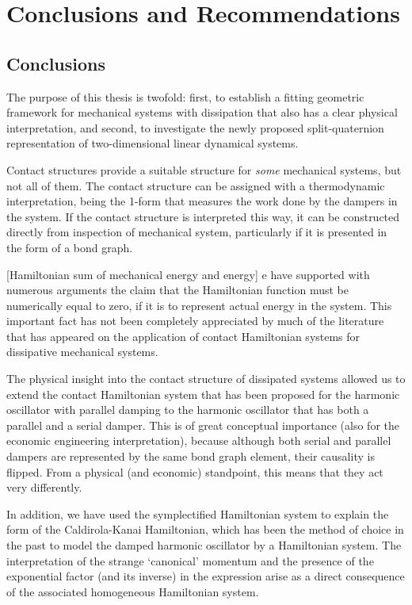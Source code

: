 \chapter{Conclusions and Recommendations}
\label{chap:conclusion}

\section*{Conclusions}
The purpose of this thesis is twofold: first, to establish a fitting geometric framework for mechanical systems with dissipation that also has a clear physical interpretation, and second, to investigate the newly proposed split-quaternion representation of two-dimensional linear dynamical systems. 

Contact structures provide a suitable structure for \emph{some} mechanical systems, but not all of them. The contact structure can be assigned with a thermodynamic interpretation, being the 1-form that measures the work done by the dampers in the system. If the contact structure is interpreted this way, it can be constructed  directly from inspection of mechanical system, particularly if it is presented in the form of a bond graph. 

[Hamiltonian sum of mechanical energy and energy] e have supported with numerous arguments the claim that the Hamiltonian function must be numerically equal to zero, if it is to represent actual energy in the system. This important fact has not been completely appreciated by much of the literature that has appeared on the application of contact Hamiltonian systems for dissipative mechanical systems.

The physical insight into the contact structure of dissipated systems allowed us to extend the contact Hamiltonian system that has been proposed for the harmonic oscillator with parallel damping to the harmonic oscillator that has both a parallel and a serial damper. This is of great conceptual importance (also for the economic engineering interpretation), because although both serial and parallel dampers are represented by the same bond graph element, their causality is flipped. From a physical (and economic) standpoint, this means that they act very differently.

In addition, we have used the symplectified Hamiltonian system to explain the form of the Caldirola-Kanai Hamiltonian, which has been the method of choice in the past to model the damped harmonic oscillator by a Hamiltonian system. The interpretation of the strange `canonical' momentum and the presence of the exponential factor (and its inverse) in the expression arise as a direct consequence of the associated homogeneous Hamiltonian system.

